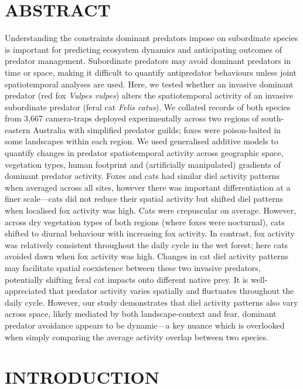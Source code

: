 \documentclass[preprint, 3p, authoryear]{elsarticle} %
\begin{document}
\linenumbers

\hypertarget{abstract}{%
\section*{ABSTRACT}\label{abstract}}

Understanding the constraints dominant predators impose on subordinate species is important for predicting ecosystem dynamics and anticipating outcomes of predator management. Subordinate predators may avoid dominant predators in time or space, making it difficult to quantify antipredator behaviours unless joint spatiotemporal analyses are used.
Here, we tested whether an invasive dominant predator (red fox \emph{Vulpes vulpes}) alters the spatiotemporal activity of an invasive subordinate predator (feral cat \emph{Felis catus}). We collated records of both species from 3,667 camera-traps deployed experimentally across two regions of south-eastern Australia with simplified predator guilds; foxes were poison-baited in some landscapes within each region. We used generalised additive models to quantify changes in predator spatiotemporal activity across geographic space, vegetation types, human footprint and (artificially manipulated) gradients of dominant predator activity.
Foxes and cats had similar diel activity patterns when averaged across all sites, however there was important differentiation at a finer scale---cats did not reduce their spatial activity but shifted diel patterns when localised fox activity was high. Cats were crepuscular on average. However, across dry vegetation types of both regions (where foxes were nocturnal), cats shifted to diurnal behaviour with increasing fox activity. In contrast, fox activity was relatively consistent throughout the daily cycle in the wet forest; here cats avoided dawn when fox activity was high. Changes in cat diel activity patterns may facilitate spatial coexistence between these two invasive predators, potentially shifting feral cat impacts onto different native prey.
It is well-appreciated that predator activity varies spatially and fluctuates throughout the daily cycle. However, our study demonstrates that diel activity patterns also vary across space, likely mediated by both landscape-context and fear. dominant predator avoidance appears to be dynamic---a key nuance which is overlooked when simply comparing the average activity overlap between two species.

\newpage

\hypertarget{introduction}{%
\section{INTRODUCTION}\label{introduction}}
\end{document}
